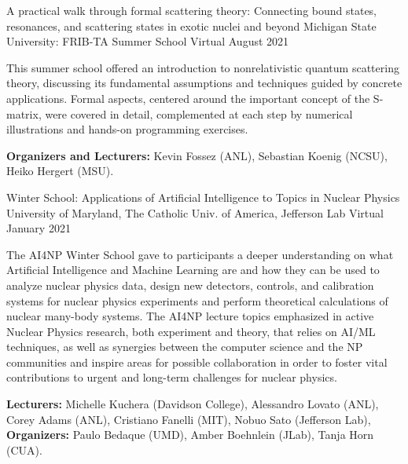 

\begin{cventries}

  \cventry
    {A practical walk through formal scattering theory: Connecting bound states, resonances, and scattering states in exotic nuclei and beyond} %
    {Michigan State University: FRIB-TA Summer School} %
    {Virtual} %
    {August 2021} %
    {
      \begin{cvitems} %
        \item {This summer school offered an introduction to nonrelativistic quantum scattering theory, discussing its fundamental assumptions and techniques guided by concrete applications. Formal aspects, centered around the important concept of the S-matrix, were covered in detail, complemented at each step by numerical illustrations and hands-on programming exercises.}
        \item {\textbf{Organizers and Lecturers:} Kevin Fossez (ANL), Sebastian Koenig (NCSU), Heiko Hergert (MSU).}
      \end{cvitems}
    }

  \cventry
    {Winter School: Applications of Artificial Intelligence to Topics in Nuclear Physics} %
    {University of Maryland, The Catholic Univ. of America, Jefferson Lab} %
    {Virtual} %
    {January 2021} %
    {
      \begin{cvitems} %
        \item {The AI4NP Winter School gave to participants a deeper understanding on what Artificial Intelligence and Machine Learning are and how they can be used to analyze nuclear physics data, design new detectors, controls, and calibration systems for nuclear physics experiments and perform theoretical calculations of nuclear many-body systems. The AI4NP lecture topics emphasized in active Nuclear Physics research, both experiment and theory, that relies on AI/ML techniques, as well as synergies between the computer science and the NP communities and inspire areas for possible collaboration in order to foster vital contributions to urgent and long-term challenges for nuclear physics.}
        \item {\textbf{Lecturers:} Michelle Kuchera (Davidson College), Alessandro Lovato (ANL), Corey Adams (ANL), Cristiano Fanelli (MIT), Nobuo Sato (Jefferson Lab), \textbf{Organizers:} Paulo Bedaque (UMD), Amber Boehnlein (JLab), Tanja Horn (CUA).}
      \end{cvitems}
    }


\end{cventries}
